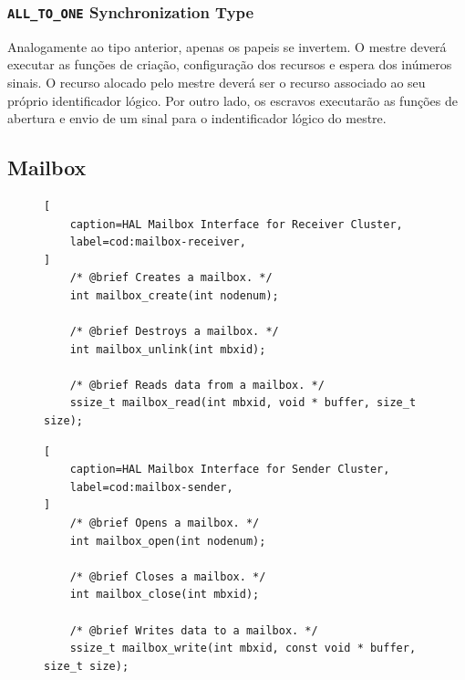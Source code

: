             \subsubsection*{\texttt{ALL\_TO\_ONE} Synchronization Type}

                Analogamente ao tipo anterior, apenas os papeis se invertem.
                O mestre deverá executar as funções de criação, configuração dos
                recursos e espera dos inúmeros sinais.
                O recurso alocado pelo mestre deverá ser o recurso associado ao
                seu próprio identificador lógico.
                Por outro lado, os escravos executarão as funções de abertura
                e envio de um sinal para o indentificador lógico do mestre.

    \subsection{Mailbox}


\begin{figure}[t]
\begin{lstlisting}[
    caption=HAL Mailbox Interface for Receiver Cluster,
    label=cod:mailbox-receiver,
]
	/* @brief Creates a mailbox. */
	int mailbox_create(int nodenum);

	/* @brief Destroys a mailbox. */
	int mailbox_unlink(int mbxid);

    /* @brief Reads data from a mailbox. */
	ssize_t mailbox_read(int mbxid, void * buffer, size_t size);
\end{lstlisting}
\end{figure}

\begin{figure}[t]
\begin{lstlisting}[
    caption=HAL Mailbox Interface for Sender Cluster,
    label=cod:mailbox-sender,
]
    /* @brief Opens a mailbox. */
	int mailbox_open(int nodenum);

	/* @brief Closes a mailbox. */
	int mailbox_close(int mbxid);

	/* @brief Writes data to a mailbox. */
	ssize_t mailbox_write(int mbxid, const void * buffer, size_t size);
\end{lstlisting}
\end{figure}

